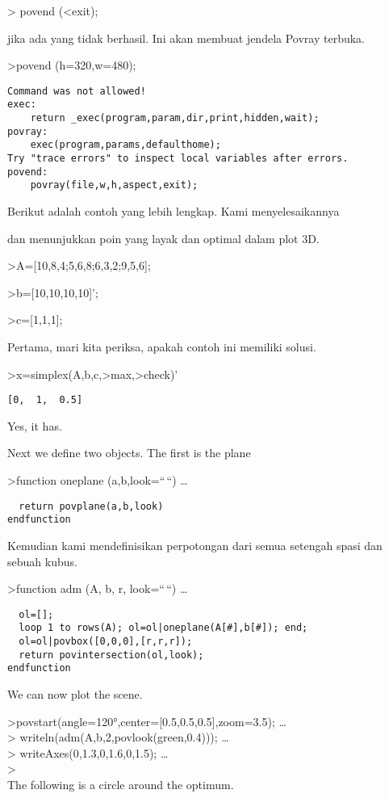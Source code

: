 \documentclass[
]{book}
\begin{document}
\textgreater{} povend (\textless exit);

jika ada yang tidak berhasil. Ini akan membuat jendela Povray terbuka.

\textgreater povend (h=320,w=480);

\begin{verbatim}
Command was not allowed!
exec:
    return _exec(program,param,dir,print,hidden,wait);
povray:
    exec(program,params,defaulthome);
Try "trace errors" to inspect local variables after errors.
povend:
    povray(file,w,h,aspect,exit); 
\end{verbatim}

Berikut adalah contoh yang lebih lengkap. Kami menyelesaikannya

dan menunjukkan poin yang layak dan optimal dalam plot 3D.

\textgreater A={[}10,8,4;5,6,8;6,3,2;9,5,6{]};

\textgreater b={[}10,10,10,10{]}';

\textgreater c={[}1,1,1{]};

Pertama, mari kita periksa, apakah contoh ini memiliki solusi.

\textgreater x=simplex(A,b,c,\textgreater max,\textgreater check)'

\begin{verbatim}
[0,  1,  0.5]
\end{verbatim}

Yes, it has.

Next we define two objects. The first is the plane

\textgreater function oneplane (a,b,look=``\,``) \ldots{}

\begin{verbatim}
  return povplane(a,b,look)
endfunction
\end{verbatim}

Kemudian kami mendefinisikan perpotongan dari semua setengah spasi dan sebuah kubus.

\textgreater function adm (A, b, r, look=``\,``) \ldots{}

\begin{verbatim}
  ol=[];
  loop 1 to rows(A); ol=ol|oneplane(A[#],b[#]); end;
  ol=ol|povbox([0,0,0],[r,r,r]);
  return povintersection(ol,look);
endfunction
\end{verbatim}

We can now plot the scene.

\textgreater povstart(angle=120°,center={[}0.5,0.5,0.5{]},zoom=3.5); \ldots{}\\
\textgreater{} writeln(adm(A,b,2,povlook(green,0.4))); \ldots{}\\
\textgreater{} writeAxes(0,1.3,0,1.6,0,1.5); \ldots{}\\
\textgreater{}\\
The following is a circle around the optimum.
\end{document}
